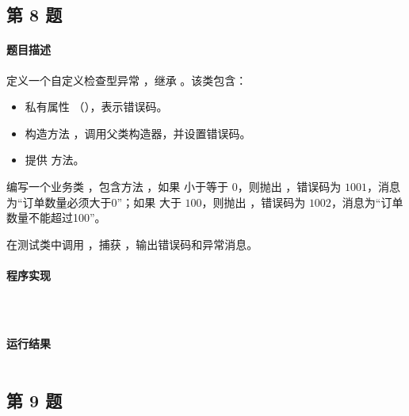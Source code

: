 \documentclass{academics}
\begin{document}
\subsection{第 8 题}

\paragraph{题目描述} {
    定义一个自定义检查型异常 ，继承 。该类包含：
    \begin{itemize}
        \item 私有属性 （），表示错误码。
        \item 构造方法 ，调用父类构造器，并设置错误码。
        \item 提供  方法。
    \end{itemize}
    编写一个业务类 ，包含方法 ，如果  小于等于 $0$，则抛出 ，错误码为 $1001$，消息为``订单数量必须大于0''；如果  大于 $100$，则抛出 ，错误码为 $1002$，消息为``订单数量不能超过100''。

    在测试类中调用 ，捕获 ，输出错误码和异常消息。
}

\paragraph{程序实现} {
    \inputminted[label=BusinessException.java]{java}{../src/P08/BusinessException.java}
    \inputminted[label=OrderService.java]{java}{../src/P08/OrderService.java}
    \inputminted[label=OrderTest.java]{java}{../src/P08/OrderTest.java}
}

\paragraph{运行结果} {
    \inputminted{text}{../res/P08.out}
}

\subsection{第 9 题}
\end{document}
